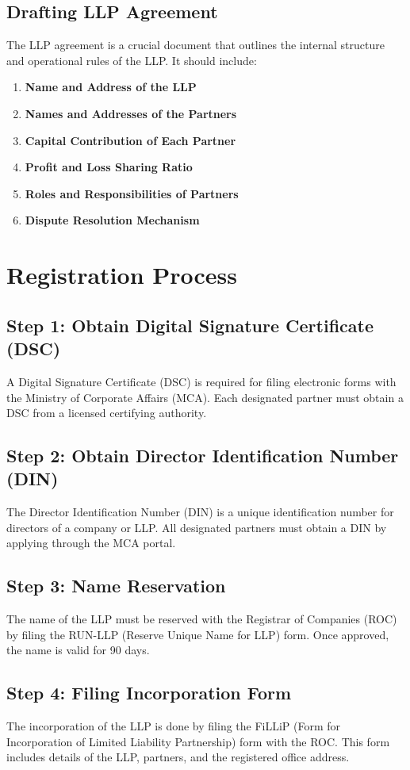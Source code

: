\documentclass[a4paper,12pt]{report}
\begin{document}
\section{Drafting LLP Agreement}
The LLP agreement is a crucial document that outlines the internal structure and operational rules of the LLP. It should include:
\begin{enumerate}
    \item \textbf{Name and Address of the LLP}
    \item \textbf{Names and Addresses of the Partners}
    \item \textbf{Capital Contribution of Each Partner}
    \item \textbf{Profit and Loss Sharing Ratio}
    \item \textbf{Roles and Responsibilities of Partners}
    \item \textbf{Dispute Resolution Mechanism}
\end{enumerate}
   

\chapter{Registration Process}
\section{Step 1: Obtain Digital Signature Certificate (DSC)}
A Digital Signature Certificate (DSC) is required for filing electronic forms with the Ministry of Corporate Affairs (MCA). Each designated partner must obtain a DSC from a licensed certifying authority.

\section{Step 2: Obtain Director Identification Number (DIN)}
The Director Identification Number (DIN) is a unique identification number for directors of a company or LLP. All designated partners must obtain a DIN by applying through the MCA portal.

\section{Step 3: Name Reservation}
The name of the LLP must be reserved with the Registrar of Companies (ROC) by filing the RUN-LLP (Reserve Unique Name for LLP) form. Once approved, the name is valid for 90 days.

\section{Step 4: Filing Incorporation Form}
The incorporation of the LLP is done by filing the FiLLiP (Form for Incorporation of Limited Liability Partnership) form with the ROC. This form includes details of the LLP, partners, and the registered office address.
\end{document}
